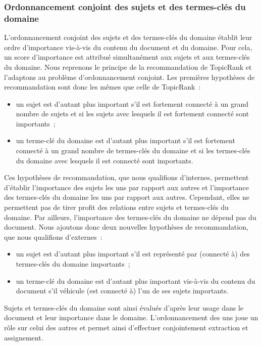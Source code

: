       \subsubsection{Ordonnancement conjoint des sujets et des termes-clés du domaine}
      \label{subsubsec:main-domain_specific_keyphrase_annotation-supervised_automatic_keyphrase_extraction-topiccorank-co_ranking}
        L'ordonnancement conjoint des sujets et des termes-clés du domaine
        établit leur ordre d'importance vis-à-vis du contenu du document et du
        domaine. Pour cela, un score d'importance est attribué simultanément aux
        sujets et aux termes-clés du domaine.
%
        Nous reprenons le principe de la recommandation de TopicRank et
        l'adaptons au problème d'ordonnancement conjoint. Les premières
        hypothèses de recommandation sont donc les mêmes que celle de
        TopicRank~:
        \begin{itemize}
          \item{un sujet est d'autant plus important s'il est fortement connecté
                à un grand nombre de sujets et si les sujets avec lesquels il
                est fortement connecté sont importants~;}
          \item{un terme-clé du domaine est d'autant plus important s'il est
                fortement connecté à un grand nombre de termes-clés du domaine
                et si les termes-clés du domaine avec lesquels il est connecté
                sont importants.}
        \end{itemize}
        Ces hypothèses de recommandation, que nous qualifions d'internes,
        permettent d'établir l'importance des sujets les uns par rapport aux
        autres et l'importance des termes-clés du domaine les uns par rapport
        aux autres. Cependant, elles ne permettent pas de tirer profit des
        relations entre sujets et termes-clés du domaine. Par ailleurs,
        l'importance des termes-clés du domaine ne  dépend pas du document. Nous
        ajoutons donc deux nouvelles hypothèses de recommandation, que nous
        qualifions d'externes~:
        \begin{itemize}
          \item{un sujet est d'autant plus important s'il est représenté par
                (connecté à) des termes-clés du domaine importants~;}
          \item{un terme-clé du domaine est d'autant plus important vis-à-vis
                du contenu du document s'il véhicule (est connecté à) l'un de
                ses sujets importants.}
        \end{itemize}
        Sujets et termes-clés du domaine sont ainsi évalués d'après leur usage
        dans le document et leur importance dans le domaine. L'ordonnancement
        des uns joue un rôle sur celui des autres et permet ainsi d'effectuer
        conjointement extraction et assignement.

